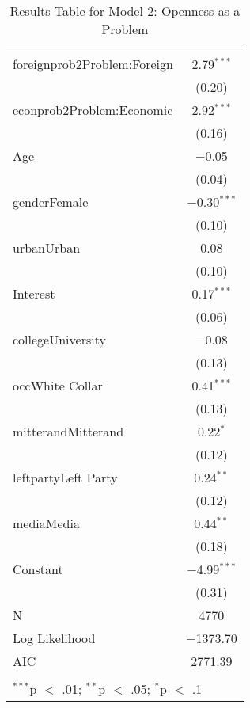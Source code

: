
\begin{table}[!htbp] \centering 
  \caption{Results Table for Model 2: Openness as a Problem} 
  \label{} 
\footnotesize 
\begin{tabular}{@{\extracolsep{5pt}}lc} 
\\[-1.8ex]\hline \\[-1.8ex] 
\hline \\[-1.8ex] 
 foreignprob2Problem:Foreign & 2.79$^{***}$ \\ 
  & (0.20) \\ 
  econprob2Problem:Economic & 2.92$^{***}$ \\ 
  & (0.16) \\ 
  Age & $-$0.05 \\ 
  & (0.04) \\ 
  genderFemale & $-$0.30$^{***}$ \\ 
  & (0.10) \\ 
  urbanUrban & 0.08 \\ 
  & (0.10) \\ 
  Interest & 0.17$^{***}$ \\ 
  & (0.06) \\ 
  collegeUniversity & $-$0.08 \\ 
  & (0.13) \\ 
  occWhite Collar & 0.41$^{***}$ \\ 
  & (0.13) \\ 
  mitterandMitterand & 0.22$^{*}$ \\ 
  & (0.12) \\ 
  leftpartyLeft Party & 0.24$^{**}$ \\ 
  & (0.12) \\ 
  mediaMedia & 0.44$^{**}$ \\ 
  & (0.18) \\ 
  Constant & $-$4.99$^{***}$ \\ 
  & (0.31) \\ 
 N & 4770 \\ 
Log Likelihood & $-$1373.70 \\ 
AIC & 2771.39 \\ 
\hline \\[-1.8ex] 
\multicolumn{2}{l}{$^{***}$p $<$ .01; $^{**}$p $<$ .05; $^{*}$p $<$ .1} \\ 
\end{tabular} 
\end{table} 
